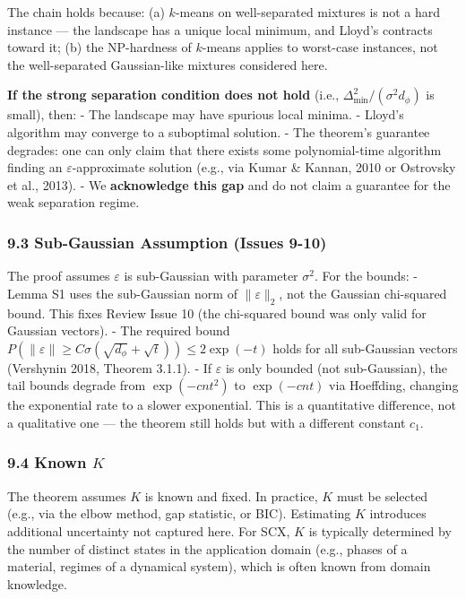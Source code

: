 \documentclass[
  12pt,
]{ctexart}
\begin{document}
The chain holds because: (a) \(k\)-means on well-separated mixtures is
not a hard instance --- the landscape has a unique local minimum, and
Lloyd's contracts toward it; (b) the NP-hardness of \(k\)-means applies
to worst-case instances, not the well-separated Gaussian-like mixtures
considered here.

\textbf{If the strong separation condition does not hold} (i.e.,
\(\Delta_{\min}^2 / (\sigma^2 d_\phi)\) is small), then: - The landscape
may have spurious local minima. - Lloyd's algorithm may converge to a
suboptimal solution. - The theorem's guarantee degrades: one can only
claim that there exists some polynomial-time algorithm finding an
\(\varepsilon\)-approximate solution (e.g., via Kumar \& Kannan, 2010 or
Ostrovsky et al., 2013). - We \textbf{acknowledge this gap} and do not
claim a guarantee for the weak separation regime.

\subsubsection{9.3 Sub-Gaussian Assumption (Issues
9-10)}\label{sub-gaussian-assumption-issues-9-10}

The proof assumes \(\varepsilon\) is sub-Gaussian with parameter
\(\sigma^2\). For the bounds: - Lemma S1 uses the sub-Gaussian norm of
\(\|\varepsilon\|_2\), not the Gaussian chi-squared bound. This fixes
Review Issue 10 (the chi-squared bound was only valid for Gaussian
vectors). - The required bound
\(P(\|\varepsilon\| \geq C\sigma(\sqrt{d_\phi} + \sqrt{t})) \leq 2\exp(-t)\)
holds for all sub-Gaussian vectors (Vershynin 2018, Theorem 3.1.1). - If
\(\varepsilon\) is only bounded (not sub-Gaussian), the tail bounds
degrade from \(\exp(-c n t^2)\) to \(\exp(-c n t)\) via Hoeffding,
changing the exponential rate to a slower exponential. This is a
quantitative difference, not a qualitative one --- the theorem still
holds but with a different constant \(c_1\).

\subsubsection{\texorpdfstring{9.4 Known
\(K\)}{9.4 Known K}}\label{known-k}

The theorem assumes \(K\) is known and fixed. In practice, \(K\) must be
selected (e.g., via the elbow method, gap statistic, or BIC). Estimating
\(K\) introduces additional uncertainty not captured here. For SCX,
\(K\) is typically determined by the number of distinct states in the
application domain (e.g., phases of a material, regimes of a dynamical
system), which is often known from domain knowledge.
\end{document}
